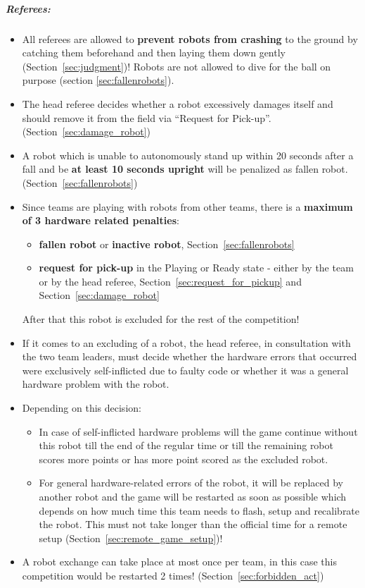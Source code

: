 \subparagraph{Referees:}
\begin{itemize}
	\item All referees are allowed to \textbf{prevent robots from crashing} to the ground by catching them beforehand and then laying them down gently (\cf Section~\ref{sec:judgment})! Robots are not allowed to dive for the ball on purpose (\cf section \ref{sec:fallenrobots}).
	
	\item The head referee decides whether a robot excessively damages itself and should remove it from the field via ``Request for Pick-up''. (\cf Section~\ref{sec:damage_robot})
	
	\item A robot which is unable to autonomously stand up within 20 seconds after a fall and be \textbf{at least 10 seconds upright} will be penalized as fallen robot. (\cf Section~\ref{sec:fallenrobots})
	
	\item Since teams are playing with robots from other teams, there is a \textbf{maximum of 3 hardware related penalties}:
		\begin{itemize}
			\item \textbf{fallen robot} or \textbf{inactive robot}, \cf Section~\ref{sec:fallenrobots}
			\item \textbf{request for pick-up} in the Playing or Ready state - either by the team or by the head referee, \cf Section~\ref{sec:request_for_pickup} and Section~\ref{sec:damage_robot}
		\end{itemize}
		After that this robot is excluded for the rest of the competition!
	
	\item If it comes to an excluding of a robot, the head referee, in consultation with the two team leaders, must decide whether the hardware errors that occurred were exclusively self-inflicted due to faulty code or whether it was a general hardware problem with the robot.
	
	\item Depending on this decision:
	\begin{itemize}
		\item In case of self-inflicted hardware problems will the game continue without this robot till the end of the regular time or till the remaining robot scores more points or has more point scored as the excluded robot. 
		\item For general hardware-related errors of the robot, it will be replaced by another robot and the game will be restarted as soon as possible which depends on how much time this team needs to flash, setup and recalibrate the robot. This must not take longer than the official time for a remote setup (\cf Section~\ref{sec:remote_game_setup})!
	\end{itemize}
	\item A robot exchange can take place at most once per team, in this case this competition would be restarted 2 times! (\cf Section~\ref{sec:forbidden_act})
\end{itemize}

